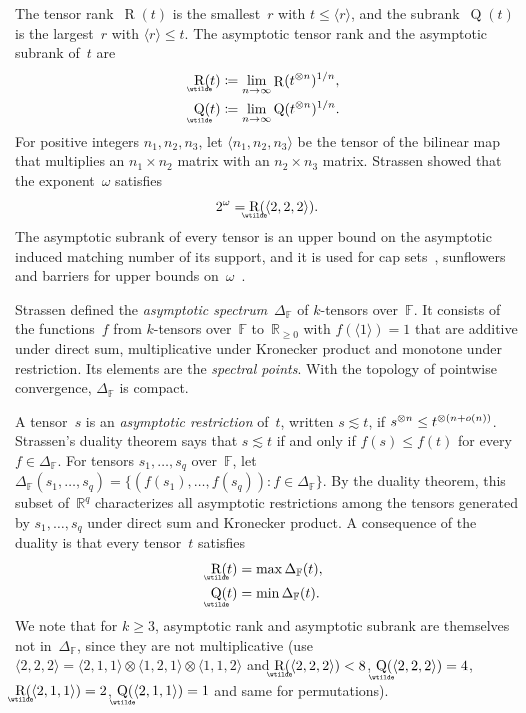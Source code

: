 \documentclass[11pt,letterpaper]{article}
\DeclareMathOperator{\subrank}{Q}
\DeclareMathOperator{\asympsubrank}{\underaccent{\wtilde}{Q}}
\DeclareMathOperator{\asymprank}{\underaccent{\wtilde}{R}}
\DeclareMathOperator{\tensorrank}{R}
\newcommand{\FF}{\mathbb{F}}
\newcommand{\RR}{\mathbb{R}}
\newcommand{\asympleq}{\lesssim}
\begin{document}
The tensor rank~\(\tensorrank(t)\) is the smallest~\(r\) with \(t\leq\langle r\rangle\), and the subrank~\(\subrank(t)\) is the largest~\(r\) with \(\langle r\rangle\leq t\). The asymptotic tensor rank and the asymptotic subrank of~\(t\) are
\begin{align*}
\asymprank(t)&\coloneqq\lim_{n\to\infty}\tensorrank(t^{\otimes n})^{1/n},\\
\asympsubrank(t)&\coloneqq\lim_{n\to\infty}\subrank(t^{\otimes n})^{1/n}.
\end{align*}
For positive integers \(n_1,n_2,n_3\), let \(\langle n_1,n_2,n_3\rangle\) be the tensor of the bilinear map that multiplies an \(n_1\times n_2\) matrix with an \(n_2\times n_3\) matrix. Strassen \cite[(1.3)]{strassen1988asymptotic} showed that the exponent~\(\omega\) satisfies
\[
2^\omega=\asymprank(\langle2,2,2\rangle).
\]
The asymptotic subrank of every tensor is an upper bound on the asymptotic induced matching number of its support, and it is used for cap sets~\cite{MR3583358,tao,sawin}, sunflowers~\cite{naslund_sawin_2017} and barriers for upper bounds on~\(\omega\)~\cite{MR3631613,MR3899623,v017a002}.

Strassen defined the \emph{asymptotic spectrum}~\(\Delta_\FF\) of \(k\)-tensors over~\(\FF\). It consists of the functions~\(f\) from \(k\)-tensors over~\(\FF\) to~\(\RR_{\geq0}\) with \(f(\langle1\rangle)=1\) that are additive under direct sum, multiplicative under Kronecker product and monotone under restriction. Its elements are the \emph{spectral points}. With the topology of pointwise convergence, \(\Delta_\FF\) is compact. 

A tensor~\(s\) is an \emph{asymptotic restriction} of~\(t\), written \(s\asympleq t\), if \(s^{\otimes n}\leq t^{\smash{\otimes(n+o(n))}}\). Strassen's duality theorem says that \(s\asympleq t\) if and only if \(f(s)\leq f(t)\) for every \(f\in\Delta_\FF\). For tensors \(s_1,\ldots,s_q\) over~\(\FF\), let \(\Delta_\FF(s_1,\ldots,s_q)=\{(f(s_1),\ldots,f(s_q)):f\in\Delta_\FF\}\). By the duality theorem, this subset of~\(\RR^q\) characterizes all asymptotic restrictions among the tensors generated by \(s_1,\ldots,s_q\) under direct sum and Kronecker product. A consequence of the duality is that every tensor~\(t\) satisfies
\begin{align*}
\asymprank(t)&=\max\Delta_\FF(t),\\
\asympsubrank(t)&=\min\Delta_\FF(t).
\end{align*}
We note that for \(k\geq3\), asymptotic rank and asymptotic subrank are themselves not in~\(\Delta_\FF\), since they are not multiplicative (use $\langle 2,2,2\rangle = \langle 2,1,1\rangle \otimes\langle 1,2,1\rangle \otimes\langle 1,1,2\rangle$ and $\asymprank(\langle 2,2,2\rangle) < 8$, $\asympsubrank(\langle 2,2,2\rangle) = 4$, $\asymprank(\langle 2,1,1\rangle) = 2$, $\asympsubrank(\langle 2,1,1\rangle) = 1$ and same for permutations).
\end{document}
